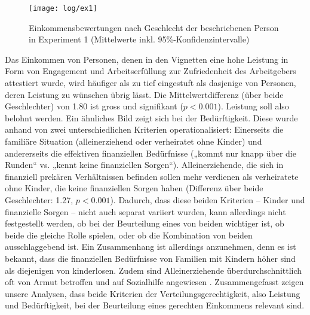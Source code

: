 \documentclass[a4paper,12pt]{article}
\begin{document}
\begin{figure}\centering
    \texttt{[image: log/ex1]}
    \caption{Einkommensbewertungen nach Geschlecht der beschriebenen Person 
    in Experiment 1 (Mittelwerte inkl. 95\%-Konfidenzintervalle)}\label{fig-ex1}
\end{figure}


Das Einkommen von Personen, denen in den Vignetten eine hohe Leistung in Form
von Engagement und Arbeitserfüllung zur Zufriedenheit des Arbeitgebers
attestiert wurde, wird häufiger als zu tief eingestuft als dasjenige von
Personen, deren Leistung zu wünschen übrig lässt. Die Mittelwertdifferenz (über
beide Geschlechter) von 1.80 ist gross und signifikant ($p<0.001$). Leistung
soll also belohnt werden. Ein ähnliches Bild zeigt sich bei der Bedürftigkeit.
Diese wurde anhand von zwei unterschiedlichen Kriterien operationalisiert:
Einerseits die familiäre Situation (alleinerziehend oder verheiratet ohne
Kinder) und andererseits die effektiven finanziellen Bedürfnisse („kommt nur
knapp über die Runden“ vs. „kennt keine finanziellen Sorgen“).
Alleinerziehende, die sich in finanziell prekären Verhältnissen befinden sollen
mehr verdienen als verheiratete ohne Kinder, die keine finanziellen Sorgen
haben (Differenz über beide Geschlechter: 1.27, $p<0.001$). Dadurch, dass diese
beiden Kriterien – Kinder und finanzielle Sorgen – nicht auch separat variiert
wurden, kann allerdings nicht festgestellt werden, ob bei der Beurteilung eines
von beiden wichtiger ist, ob beide die gleiche Rolle spielen, oder ob die
Kombination von beiden ausschlaggebend ist. Ein Zusammenhang ist allerdings
anzunehmen, denn es ist bekannt, dass die finanziellen Bedürfnisse von Familien
mit Kindern höher sind als diejenigen von kinderlosen. Zudem sind
Alleinerziehende überdurchschnittlich oft von Armut betroffen und auf
Sozialhilfe angewiesen \citep{Amacker-etal-2015}. Zusammengefasst zeigen unsere
Analysen, dass beide Kriterien der Verteilungsgerechtigkeit, also Leistung und
Bedürftigkeit, bei der Beurteilung eines gerechten Einkommens relevant sind.

\end{document}
